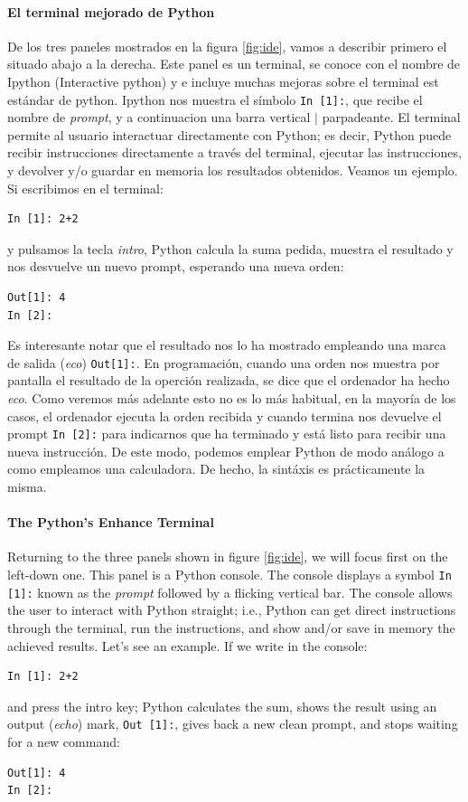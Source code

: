 \begin{paracol}{2}
\paragraph{El terminal mejorado de Python}
De los tres paneles mostrados en la figura \ref{fig:ide}, vamos a describir primero el situado abajo a la derecha. Este panel es un terminal, se conoce con el nombre de Ipython (Interactive python) y e incluye muchas mejoras sobre el terminal est estándar de python. Ipython nos muestra el símbolo \texttt{In [1]:}, que recibe el nombre de \emph{prompt}, y a continuacion una barra vertical $|$ parpadeante. El terminal permite al usuario interactuar directamente con Python; es decir, Python puede recibir instrucciones directamente a través del terminal, ejecutar las instrucciones, y devolver y/o guardar en memoria los resultados obtenidos.  Veamos un ejemplo. Si escribimos en el terminal:
\begin{verbatim}
In [1]: 2+2
\end{verbatim}
y pulsamos la tecla \emph{intro}, Python calcula la suma pedida, muestra el resultado y nos desvuelve un nuevo prompt, esperando una nueva orden:
\begin{verbatim}
Out[1]: 4
In [2]:
\end{verbatim}
Es interesante notar que el resultado nos lo ha mostrado empleando una marca de salida (\emph{eco}) \texttt{Out[1]:}. En programación, cuando una orden nos muestra por pantalla el resultado de la operción realizada, se dice que el ordenador ha hecho \emph{eco}. Como veremos más adelante esto no es lo más habitual, en la mayoría de los casos, el ordenador ejecuta la orden recibida y cuando termina nos devuelve el prompt \texttt{In [2]:} para indicarnos que ha terminado y está listo para recibir una nueva instrucción. De este modo, podemos emplear Python de modo análogo a como empleamos una calculadora. De hecho, la sintáxis es prácticamente la misma.
\switchcolumn
\paragraph{The Python's Enhance Terminal}
Returning to the three panels shown in figure \ref{fig:ide}, we will focus first on the left-down one. This panel is a Python console. The console displays a symbol \texttt{In [1]:} known as the \emph{prompt} followed by a flicking vertical bar. The console allows the user to interact with Python straight; i.e., Python can get direct instructions through the terminal, run the instructions, and show and/or save in memory the achieved results. Let's see an example. If we write in the console:
\begin{verbatim}
In [1]: 2+2
\end{verbatim}
and press the intro key; Python calculates the sum, shows the result using an output (\emph{echo}) mark,  \texttt{Out [1]:}, gives back a new clean prompt, and stops waiting for a new command:
\begin{verbatim}
Out[1]: 4
In [2]:
\end{verbatim}


\end{paracol}
